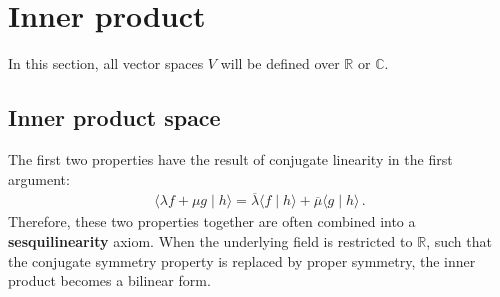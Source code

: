 \section{Inner product}\label{section:innerproduct}

    In this section, all vector spaces $V$ will be defined over $\mathbb{R}$ or $\mathbb{C}$.

\subsection{Inner product space}

    \begin{result}
        The first two properties have the result of conjugate linearity in the first argument:
        \begin{gather}
            \langle \lambda f + \mu g\mid h \rangle = \overline{\lambda}\langle f\mid h \rangle + \overline{\mu}\langle g\mid h \rangle\,.
        \end{gather}
        Therefore, these two properties together are often combined into a \textbf{sesquilinearity} axiom. When the underlying field is restricted to $\mathbb{R}$, such that the conjugate symmetry property is replaced by proper symmetry, the inner product becomes a bilinear form.
    \end{result}


